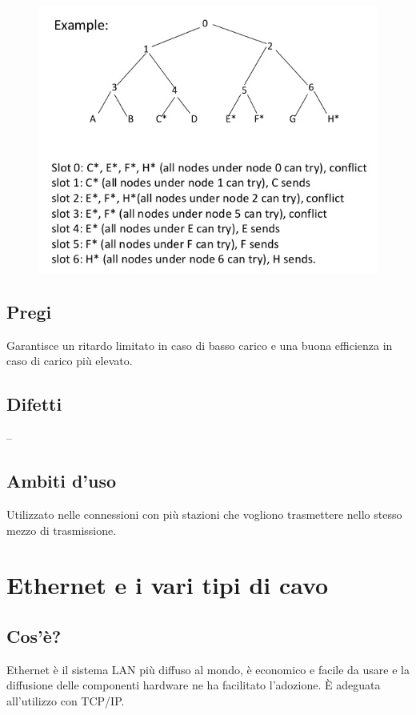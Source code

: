 \begin{figure}[H]
\centering
\includegraphics[scale=0.7]{res/img/26_AdaptiveTreeProtocol.png}
\end{figure}

\subsection{Pregi}
Garantisce un ritardo limitato in caso di basso carico e una buona efficienza in caso di carico più elevato.
\subsection{Difetti}
--
\subsection{Ambiti d'uso}
Utilizzato nelle connessioni con più stazioni che vogliono trasmettere nello stesso mezzo di trasmissione.

\section{Ethernet e i vari tipi di cavo}
\subsection{Cos'è?}
Ethernet è il sistema LAN più diffuso al mondo, è economico e facile da usare e la diffusione delle componenti hardware ne ha facilitato l'adozione. È adeguata all'utilizzo con TCP/IP.

